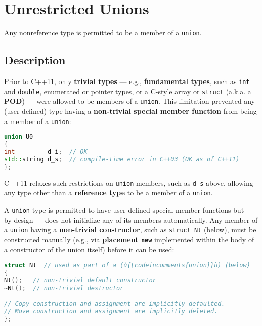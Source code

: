\newpage
\section[Unrestricted Unions]{Unrestricted Unions}\label{unrestricted-unions}


Any nonreference type is permitted to be a member of a \texttt{union}.

\subsection[Description]{Description}\label{unrestrictedunion-description}

Prior to C++11, only \textbf{trivial types} --- e.g.,
\textbf{fundamental types}, such as \texttt{int} and \texttt{double},
enumerated or pointer types, or a C-style array or \texttt{struct}
(a.k.a. a \textbf{POD}) --- were allowed to be members of a
\texttt{union}. This limitation prevented any (user-defined) type having
a \textbf{non-trivial special member function} from being a member of a
\texttt{union}:

\begin{lstlisting}[language=C++]
union U0
{
int         d_i;  // OK
std::string d_s;  // compile-time error in C++03 (OK as of C++11)
};
\end{lstlisting}

\noindent C++11 relaxes such restrictions on \texttt{union} members, such as
\texttt{d\_s} above, allowing any type other than a \textbf{reference
type} to be a member of a \texttt{union}.

A \texttt{union} type is permitted to have user-defined special member
functions but --- by design --- does not initialize any of its members
automatically. Any member of a \texttt{union} having a
\textbf{non-trivial constructor}, such as \texttt{struct}~\texttt{Nt}
(below), must be constructed manually (e.g., via \textbf{placement
\texttt{new}} implemented within the body of a constructor of the union
itself) before it can be used:

\begin{lstlisting}[language=C++]
struct Nt  // used as part of a (ù{\codeincomments{union}}ù) (below)
{
Nt();   // non-trivial default constructor
~Nt();  // non-trivial destructor

// Copy construction and assignment are implicitly defaulted.
// Move construction and assignment are implicitly deleted.
};
\end{lstlisting}

